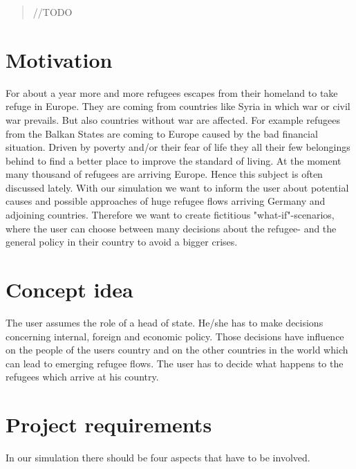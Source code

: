 \documentclass{acm_proc_article-sp}
\begin{document}
\begin{abstract}
//TODO
\end{abstract}

\section{Motivation}
For about a year more and more refugees escapes from their homeland to take refuge in Europe. They are coming from countries like Syria in which war or civil war prevails. But also countries without war are affected. For example refugees from the Balkan States are coming to Europe caused by the bad financial situation. Driven by poverty and/or their fear of life they all their few belongings behind to find a better place to improve the standard of living. At the moment many thousand of refugees are arriving Europe. Hence this subject is often discussed lately. With our simulation we want to inform the user about potential causes and possible approaches of huge refugee flows arriving Germany and adjoining countries. Therefore we want to create fictitious "what-if"-scenarios, where the user can choose between many decisions about the refugee- and the general policy in their country to avoid a bigger crises.


%

\section{Concept idea}
\label{concept idea}
The user assumes the role of a head of state. He/she has to make decisions concerning internal, foreign and economic policy. Those decisions have influence on the people of the users country  and on the other countries in the world which can lead to emerging refugee flows. The user has to decide what happens to the refugees which arrive at his country. 

\section{Project requirements}
In our simulation there should be four aspects that have to be involved.
\end{document}
